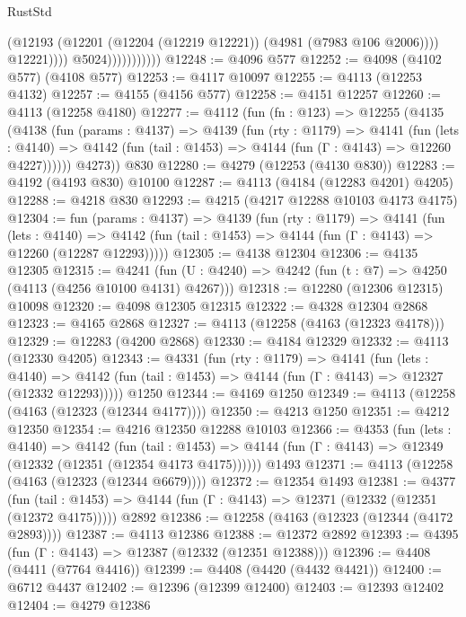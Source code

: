 \begin{lexlean}{RustStd}
\begin{coremodule}
                                  (@12193
                                    (@12201 (@12204 (@12219 @12221)) (@4981 (@7983 @106 @2006))))
                                  @12221))))
                          @5024)))))))))))
@12248 := @4096 @577
@12252 := @4098 (@4102 @577) (@4108 @577)
@12253 := @4117 @10097
@12255 := @4113 (@12253 @4132)
@12257 := @4155 (@4156 @577)
@12258 := @4151 @12257
@12260 := @4113 (@12258 @4180)
@12277 := @4112
    (fun (fn : @123) =>
    @12255
      (@4135
        (@4138
          (fun (params : @4137) =>
          @4139
            (fun (rty : @1179) =>
            @4141
              (fun (lets : @4140) =>
              @4142 (fun (tail : @1453) => @4144 (fun (Γ : @4143) => @12260 @4227))))))
        @4273))
    @830
@12280 := @4279 (@12253 (@4130 @830))
@12283 := @4192 (@4193 @830) @10100
@12287 := @4113 (@4184 (@12283 @4201) @4205)
@12288 := @4218 @830
@12293 := @4215 (@4217 @12288 @10103 @4173 @4175)
@12304 := fun (params : @4137) =>
  @4139
    (fun (rty : @1179) =>
    @4141
      (fun (lets : @4140) =>
      @4142 (fun (tail : @1453) => @4144 (fun (Γ : @4143) => @12260 (@12287 @12293)))))
@12305 := @4138 @12304
@12306 := @4135 @12305
@12315 := @4241
    (fun (U : @4240) => @4242 (fun (t : @7) => @4250 (@4113 (@4256 @10100 @4131) @4267)))
@12318 := @12280 (@12306 @12315) @10098
@12320 := @4098 @12305 @12315
@12322 := @4328 @12304 @2868
@12323 := @4165 @2868
@12327 := @4113 (@12258 (@4163 (@12323 @4178)))
@12329 := @12283 (@4200 @2868)
@12330 := @4184 @12329
@12332 := @4113 (@12330 @4205)
@12343 := @4331
    (fun (rty : @1179) =>
    @4141
      (fun (lets : @4140) =>
      @4142 (fun (tail : @1453) => @4144 (fun (Γ : @4143) => @12327 (@12332 @12293)))))
    @1250
@12344 := @4169 @1250
@12349 := @4113 (@12258 (@4163 (@12323 (@12344 @4177))))
@12350 := @4213 @1250
@12351 := @4212 @12350
@12354 := @4216 @12350 @12288 @10103
@12366 := @4353
    (fun (lets : @4140) =>
    @4142
      (fun (tail : @1453) =>
      @4144 (fun (Γ : @4143) => @12349 (@12332 (@12351 (@12354 @4173 @4175))))))
    @1493
@12371 := @4113 (@12258 (@4163 (@12323 (@12344 @6679))))
@12372 := @12354 @1493
@12381 := @4377
    (fun (tail : @1453) => @4144 (fun (Γ : @4143) => @12371 (@12332 (@12351 (@12372 @4175)))))
    @2892
@12386 := @12258 (@4163 (@12323 (@12344 (@4172 @2893))))
@12387 := @4113 @12386
@12388 := @12372 @2892
@12393 := @4395 (fun (Γ : @4143) => @12387 (@12332 (@12351 @12388)))
@12396 := @4408 (@4411 (@7764 @4416))
@12399 := @4408 (@4420 (@4432 @4421))
@12400 := @6712 @4437
@12402 := @12396 (@12399 @12400)
@12403 := @12393 @12402
@12404 := @4279 @12386

\end{coremodule}
\end{lexlean}
